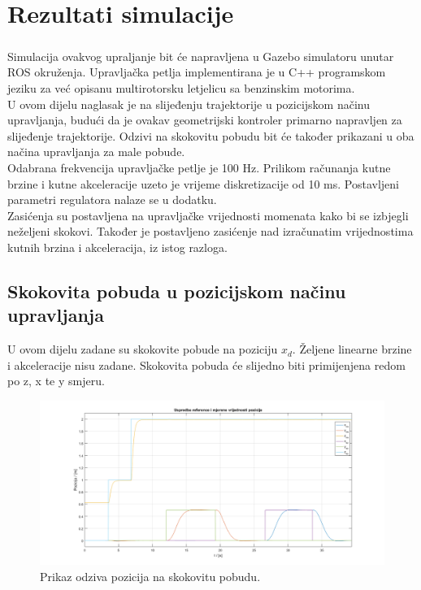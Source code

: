\documentclass[times, utf8, diplomski]{fer}
\begin{document}
\chapter{Rezultati simulacije}

	\paragraph{}Simulacija ovakvog upraljanje bit će napravljena u Gazebo simulatoru unutar ROS okruženja. Upravljačka petlja implementirana je u C++ programskom jeziku za već opisanu multirotorsku letjelicu sa benzinskim motorima. \\
	U ovom dijelu naglasak je na slijeđenju trajektorije u pozicijskom načinu upravljanja, budući da je ovakav geometrijski kontroler primarno napravljen za slijeđenje trajektorije. Odzivi na skokovitu pobudu bit će također prikazani u oba načina upravljanja za male pobude. \\
	Odabrana frekvencija upravljačke petlje je 100 Hz. Prilikom računanja kutne brzine i kutne akceleracije uzeto je vrijeme diskretizacije od 10 ms. Postavljeni parametri regulatora nalaze se u dodatku. \\
	Zasićenja su postavljena na upravljačke vrijednosti momenata kako bi se izbjegli neželjeni skokovi. Također je postavljeno zasićenje nad izračunatim vrijednostima kutnih brzina i akceleracija, iz istog razloga.
	
	\section{Skokovita pobuda u pozicijskom načinu upravljanja}
	U ovom dijelu zadane su skokovite pobude na poziciju $x_d$. Željene linearne brzine i akceleracije nisu zadane. Skokovita pobuda će slijedno biti primijenjena redom po z, x te y smjeru.
	
	\begin{figure}[h!]
		\includegraphics[width=\textwidth]{plots/pos_pos2.png}
		\caption{Prikaz odziva pozicija na skokovitu pobudu.}
	\end{figure}
	
\end{document}
